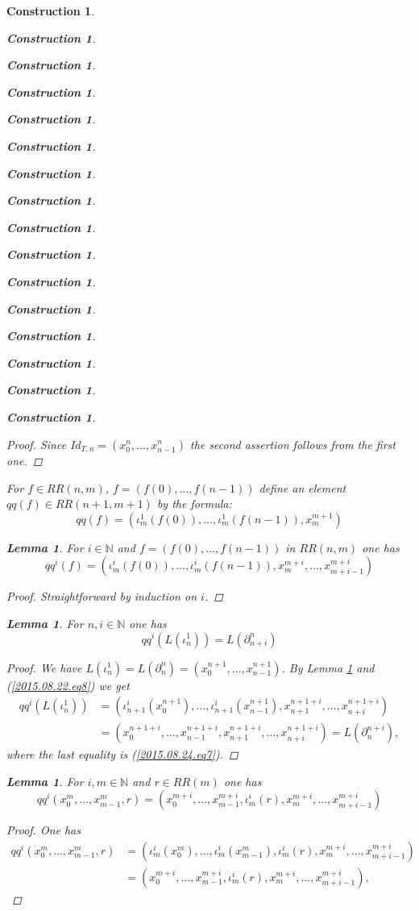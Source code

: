 \documentclass[12pt]{amsart}
\newtheorem{lemma}[proposition]{Lemma}
\numberwithin{proposition}{subsection}
\newtheorem{construction}[proposition]{Construction}
\newcommand{\llabel}[1]{\label{#1}}
\newcommand{\nn}{{\mathbb N}}
\newcommand{\nat}{\nn}
\begin{document}
\begin{construction}
\begin{construction}
\begin{construction}
\begin{construction}
\begin{construction}
\begin{construction}
\begin{construction}
\begin{construction}
\begin{construction}
\begin{construction}
\begin{construction}
\begin{construction}
\begin{construction}
\begin{construction}
\begin{construction}
\begin{construction}
\begin{proof}
Since $Id_{T,n}=(x_0^n,\dots,x_{n-1}^n)$ the second assertion follows from the first one.
\end{proof}
%
For $f\in RR(n,m)$, $f=(f(0),\dots,f(n-1))$ define an element $qq(f)\in RR(n+1,m+1)$ by the formula: 
%
\begin{equation}\llabel{2015.08.26.eq9}
qq(f)=(\iota_m^1(f(0)),\dots,\iota_m^1(f(n-1)),x_m^{m+1})
\end{equation}%
%
\begin{lemma}
\llabel{2015.08.26.l2}
For $i\in\nat$ and $f=(f(0),\dots,f(n-1))$ in $RR(n,m)$ one has
%
$$qq^i(f)=(\iota_m^i(f(0)),\dots,\iota_m^i(f(n-1)),x_m^{m+i},\dots,x_{m+i-1}^{m+i})$$
%
\end{lemma}
%
\begin{proof}
Straightforward by induction on $i$.
\end{proof}
%
\begin{lemma}
\llabel{2015.08.26.l3a}
For $n,i\in\nat$ one has
%
$$qq^i(L(\iota_n^1))=L(\partial^n_{n+i})$$
%
\end{lemma}
%
\begin{proof}
We have ${L}(\iota_n^1)=L(\partial_n^n)=(x_0^{n+1},\dots,x^{n+1}_{n-1})$. By
Lemma \ref{2015.08.26.l2} and (\ref{2015.08.22.eq8}) we get
\begin{equation*}
  \begin{split}
    qq^i({L}(\iota_n^1))&=(\iota_{n+1}^i(x_0^{n+1}),\dots,\iota_{n+1}^i(x_{n-1}^{n+1}),x_{n+1}^{n+1+i},\dots,x_{n+i}^{n+1+i})
    \\
    &=(x_0^{n+1+i},\dots,x_{n-1}^{n+1+i},x_{n+1}^{n+1+i},\dots,x_{n+i}^{n+1+i})=L(\partial_n^{n+i}),
  \end{split}
\end{equation*}
where the last equality is (\ref{2015.08.24.eq7}). 
\end{proof}
%
\begin{lemma}
\llabel{2015.08.28.l1}
For $i,m\in\nat$ and $r\in RR(m)$ one has
%
$$qq^i(x_0^m,\dots,x^m_{m-1},r)=(x_0^{m+i},\dots,x^{m+i}_{m-1},\iota_m^i(r),x_m^{m+i},\dots,x_{m+i-1}^{m+i})$$
%
\end{lemma}
%
\begin{proof}
One has
\begin{equation*}
  \begin{split}
    qq^i(x_0^m,\dots,x^m_{m-1},r)&=(\iota_m^i(x_0^m),\dots,\iota_m^i(x^m_{m-1}),\iota_m^i(r),x_m^{m+i},\dots,x_{m+i-1}^{m+i})
    \\&=(x_0^{m+i},\dots,x^{m+i}_{m-1},\iota_m^i(r),x_m^{m+i},\dots,x_{m+i-1}^{m+i}),
  \end{split}

\end{equation*}
\end{proof}
\end{construction}
\end{construction}
\end{construction}
\end{construction}
\end{construction}
\end{construction}
\end{construction}
\end{construction}
\end{construction}
\end{construction}
\end{construction}
\end{construction}
\end{construction}
\end{construction}
\end{construction}
\end{construction}
\end{document}
